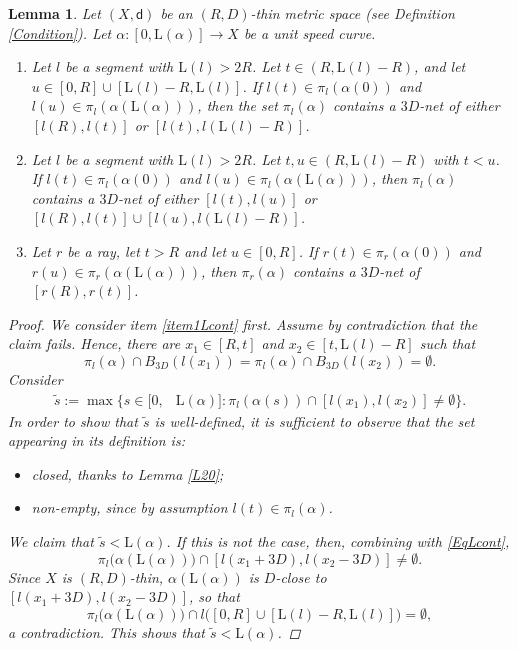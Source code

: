 \documentclass[10pt]{article}
\newtheorem{lemma}[thm]{Lemma}
\theoremstyle{definition}
\newcommand{\length}{\mathrm{L}}
\newcommand{\sd}{\mathsf{d}}
\begin{document}
\begin{lemma} \label{nuovocontinuitylemma}
    Let $(X,\sd)$ be an $(R,D)$-thin metric space (see Definition \ref{Condition}). Let $\alpha:[0,\length(\alpha)] \to X$ be a unit speed curve.
    \begin{enumerate}
        \item \label{item1Lcont}
        Let $l$ be a segment with $\length(l)>2R$. Let $t \in (R,\length(l)-R)$, and let $u \in [0,R] \cup [\length(l)-R,\length(l)]$. If $l(t) \in \pi_l(\alpha(0))$ and $l(u) \in \pi_l(\alpha(\length(\alpha)))$, then the set $\pi_l(\alpha)$ contains a $3D$-net of either $[l(R),l(t)]$ or $[l(t),l(\length(l)-R)]$.
        \item \label{item2Lcont}
        Let $l$ be a segment with $\length(l)>2R$. Let $t,u \in (R,\length(l)-R)$ with $t<u$. If $l(t) \in \pi_l(\alpha(0))$ and $l(u) \in \pi_l(\alpha(\length(\alpha)))$, then $\pi_l(\alpha)$ contains a $3D$-net of either $[l(t),l(u)]$ or $[l(R),l(t)] \cup [l(u),l(\length(l)-R)]$.
        \item \label{item3Lcont}
        Let $r$ be a ray, let $t>R$ and let $u \in [0,R]$. If $r(t) \in \pi_r(\alpha(0))$ and $r(u) \in \pi_r(\alpha(\length(\alpha)))$, then $\pi_r(\alpha)$ contains a $3D$-net of $[r(R),r(t)]$.
        \end{enumerate}
        \begin{proof}
            We consider item \ref{item1Lcont} first.
            Assume by contradiction that the claim fails. Hence, there are $x_1 \in [R,t]$ and $x_2 \in [t,\length(l)-R]$ such that 
            \begin{equation} \label{EqLcont}
            \pi_l(\alpha) \cap B_{3D}(l(x_1))=\pi_l(\alpha) \cap B_{3D}(l(x_2))=\emptyset.
            \end{equation}
Consider
\begin{align*}
\tilde{s}:=\max \Big\{s \in [0,&\length(\alpha)]: \pi_l(\alpha(s)) \cap [l(x_1),l(x_2)] \neq \emptyset \Big\}.
\end{align*}
In order to show that $\tilde{s}$ is well-defined, it is sufficient to observe that the set appearing in its definition is:
\begin{itemize}
\item \emph{closed}, thanks to Lemma \ref{L20}; 
\item  \emph{non-empty}, since by assumption $l(t) \in \pi_l(\alpha)$.
\end{itemize}
We claim that $\tilde{s} < \length(\alpha)$. If this is not the case, then, combining with \eqref{EqLcont}, 
\[
\pi_l\big(\alpha(\length(\alpha))\big) \cap [l(x_1+3D),l(x_2-3D)] \neq \emptyset.
\]
Since $X$ is $(R,D)$-thin, $\alpha(\length(\alpha))$ is $D$-close to $[l(x_1+3D),l(x_2-3D)]$, so that 
\[
\pi_l\big(\alpha(\length(\alpha)) \big) \cap l\big([0,R] \cup [\length(l)-R,\length(l)] \big)=\emptyset,
\]
a contradiction. This shows that $\tilde{s} < \length(\alpha)$.


\end{proof}
\end{lemma}
\end{document}

